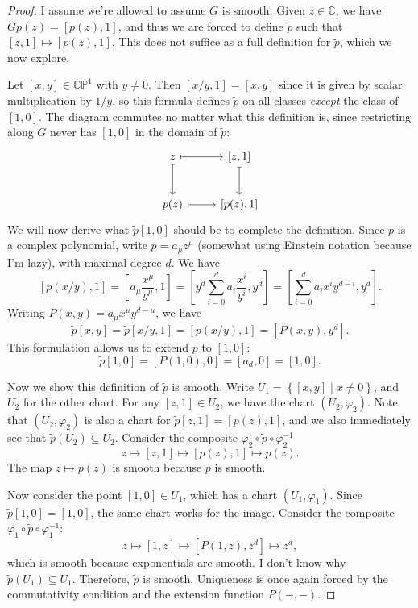 \documentclass[11pt, letterpaper]{article}
\theoremstyle{theorem}
\begin{document}
\begin{proof}
	I assume we're allowed to assume $G$ is smooth. Given $z\in\mathbb{C} $, we have $Gp(z)=[p(z),1]$, and thus we are forced to define $\widetilde{p} $ such that $[z,1]\mapsto [p(z),1]$. This does not suffice as a full definition for $\widetilde{p}$, which we now explore.

	Let $[x,y]\in\mathbb{C} \mathbb{P} ^1$ with $y\neq 0$. Then $[x/y, 1]=[x,y]$ since it is given by scalar multiplication by $1/y$, so this formula defines $\widetilde{p} $ on all classes \emph{except} the class of $[1,0]$. The diagram commutes no matter what this definition is, since restricting along $G$ never has $[1,0]$ in the domain of $\widetilde{p} $:
	\[\begin{tikzcd}[row sep = 2.5em, column sep = 2.5em]
		z \ar[r, mapsto] \ar[d, mapsto]  & {[z,1]}\ar[d, mapsto]  \\
		p(z)\ar[r, mapsto]  & {[p(z),1]}
	\end{tikzcd}\]
	We will now derive what $\widetilde{p} [1,0]$ should be to complete the definition. Since $p$ is a complex polynomial, write $p=a_\mu z^\mu $ (somewhat using Einstein notation because I'm lazy), with maximal degree $d$. We have
	\[
		[p(x/y),1]=\left[ a_\mu \frac{x^\mu }{y^\mu } ,1 \right] =\left[ y^d \sum_{i=0}^{d} a_i \frac{x^i}{y^i} ,y^d \right] =\left[ \sum_{i=0}^{d} a_ix^iy^{d-i} ,y^d \right] 
	.\]
	Writing $P(x,y)=a_\mu x^\mu y^{d-\mu } $, we have
	\[
		\widetilde{p} [x,y]=\widetilde{p} [x/y,1]=[p(x/y),1]=[P(x,y),y^d]
	.\]
	This formulation allows us to extend $\widetilde{p} $ to $[1,0]$:
	\[
		\widetilde{p} [1,0]=[P(1,0),0]=\left[ a_d,0 \right] =[1,0]
	.\]
	
	Now we show this definition of $\widetilde{p} $ is smooth. Write $U_1=\left\{ [x,y]\mid x\neq 0 \right\} $, and $U_2$ for the other chart. For any $[z,1]\in U_2$, we have the chart $(U_2,\varphi _2)$. Note that $(U_2,\varphi _2)$ is also a chart for $\widetilde{p} [z,1]=[p(z),1]$, and we also immediately see that $\widetilde{p} (U_2)\subseteq U_2$. Consider the composite $\varphi _2 \circ \widetilde{p} \circ \varphi _2^{-1} $
	\[
		z\mapsto [z,1]\mapsto [p(z),1]\mapsto p(z).
	\]
	The map $z\mapsto p(z)$ is smooth because $p$ is smooth.

	Now consider the point $[1,0]\in U_1$, which has a chart $(U_1,\varphi _1)$. Since $\widetilde{p} [1,0]=[1,0]$, the same chart works for the image. Consider the composite $\varphi _1 \circ \widetilde{p} \circ \varphi _1^{-1} $:
	\[
		z\mapsto [1,z]\mapsto [P(1,z),z^d]\mapsto z^d,
	\]
	which is smooth because exponentials are smooth. I don't know why $\widetilde{p} (U_1)\subseteq U_1$. Therefore, $\widetilde{p} $ is smooth. Uniqueness is once again forced by the commutativity condition and the extension function $P(-,-)$.
\end{proof}
\end{document}
